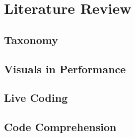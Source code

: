
\chapter{Literature Review}
\label{cha:literaturereview}

\section{Taxonomy}
\label{sec:taxonomy}

\section{Visuals in Performance}
\label{sec:visualperformance}

\section{Live Coding}
\label{sec:livecoding}

\section{Code Comprehension}
\label{sec:codecomprehension}


